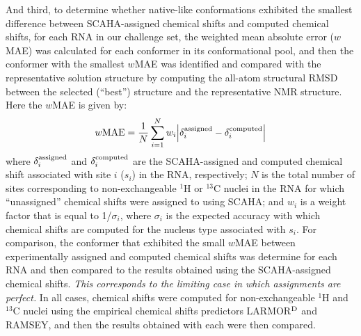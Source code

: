 \documentclass[journal=jcisd8,manuscript=article,layout=onecolumn]{achemso}
\begin{document}
And third, to determine whether native-like conformations exhibited the smallest difference between SCAHA-assigned chemical shifts and computed chemical shifts, for each RNA in our challenge set, the weighted mean absolute error ($w$MAE) was calculated for each conformer in its conformational pool, and then the conformer with the smallest $w$MAE was identified and compared with the representative solution structure by computing the all-atom structural RMSD between the selected (``best'')  structure and the representative NMR structure.  Here the $w$MAE is given by:
\begin{equation}\label{eq:wmae} 
w{\rm MAE} =  \frac{1}{N} \sum_{i=1}^{N} w_{i} \Big{|} \delta_{i}^{\rm assigned} - \delta_{i}^{\rm computed}\Big{|}
\end{equation}
where $\delta_{i}^{\rm assigned}$ and $\delta_{i}^{\rm computed}$ are the SCAHA-assigned and computed chemical shift associated with site $i$ ($s_{i}$) in the RNA, respectively; $N$ is the total number of sites corresponding to non-exchangeable $^{1}$H or $^{13}$C nuclei in the RNA for which ``unassigned'' chemical shifts were assigned to using SCAHA; and $w_{i}$ is a weight factor that is equal to 1/$\sigma_{i}$, where $\sigma_{i}$ is the expected accuracy with which chemical shifts are computed for the nucleus type associated with $s_{i}$\cite{frank2016can}. For comparison, the conformer that exhibited the small $w$MAE between experimentally assigned and computed chemical shifts was determine for each RNA and then compared to the results obtained using the SCAHA-assigned chemical shifts. \textit{This corresponds to the limiting case in which assignments are perfect.} In all cases, chemical shifts were computed for non-exchangeable $^{1}$H and $^{13}$C nuclei using the empirical chemical shifts predictors LARMOR$^{\rm D}$ and RAMSEY, and then the results obtained with each were then compared.
\end{document}
